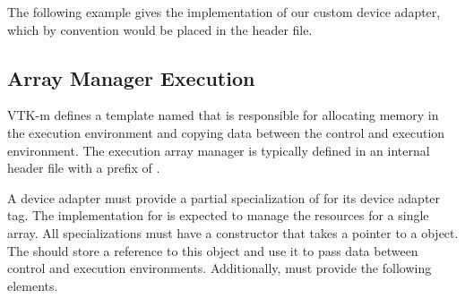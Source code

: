 The following example gives the implementation of our custom device
adapter, which by convention would be placed in the
header file.



\subsection{Array Manager Execution}


VTK-m defines a template named 
that is responsible for allocating memory in the execution environment and
copying data between the control and execution environment. The execution
array manager is typically defined in an internal header file with a prefix
of .


A device adapter must provide a partial specialization of
 for its device adapter tag. The
implementation for  is expected to
manage the resources for a single array. All
 specializations must have a
constructor that takes a pointer to a  object.
The  should store a reference to this
 object and use it to pass data between control and
execution environments. Additionally,
 must provide the following elements.

